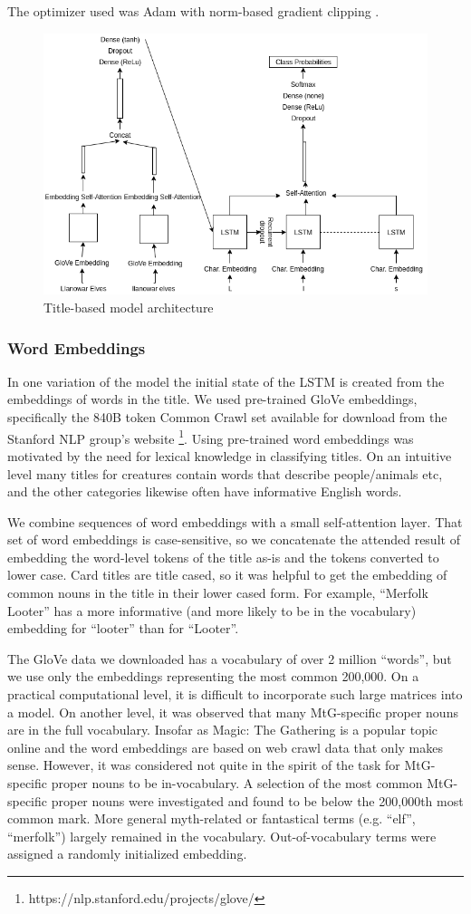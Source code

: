 \documentclass[letterpaper]{article} %
\begin{document}
The optimizer used was Adam \cite{Kingma2014AdamAM}
with norm-based gradient clipping \cite{Pascanu2012UnderstandingTE}.

\begin{figure}
  \includegraphics[width=.5\textwidth]{text-architecture}
  \caption{Title-based model architecture}
\end{figure}

\subsubsection{Word Embeddings}

In one variation of the model
the initial state of the LSTM
is created from the embeddings of words in the title.
We used pre-trained GloVe \cite{Pennington2014GloveGV} embeddings,
specifically the 840B token Common Crawl set
available for download from the Stanford NLP group's website
\footnote{https://nlp.stanford.edu/projects/glove/}.
Using pre-trained word embeddings
was motivated by the need for lexical knowledge in classifying titles.
On an intuitive level many titles for creatures
contain words that describe people/animals etc,
and the other categories likewise often have informative English words.

We combine sequences of word embeddings with a small self-attention layer.
That set of word embeddings is case-sensitive,
so we concatenate the attended result of embedding
the word-level tokens of the title as-is
and the tokens converted to lower case.
Card titles are title cased,
so it was helpful to get the embedding of common nouns in the title
in their lower cased form.
For example,
``Merfolk Looter''
has a more informative (and more likely to be in the vocabulary)
embedding for ``looter'' than for ``Looter''.

The GloVe data we downloaded has a vocabulary of over 2 million ``words'',
but we use only the embeddings representing the most common 200,000.
On a practical computational level,
it is difficult to incorporate such large matrices into a model.
On another level,
it was observed that many MtG-specific proper nouns are in the full vocabulary.
Insofar as Magic: The Gathering is a popular topic online and the word embeddings
are based on web crawl data that only makes sense.
However,
it was considered not quite in the spirit of the task
for MtG-specific proper nouns to be in-vocabulary.
A selection of the most common MtG-specific proper nouns were investigated
and found to be below the 200,000th most common mark.
More general myth-related or fantastical terms (e.g. ``elf'', ``merfolk'')
largely remained in the vocabulary.
Out-of-vocabulary terms were assigned a randomly initialized embedding.
\end{document}
